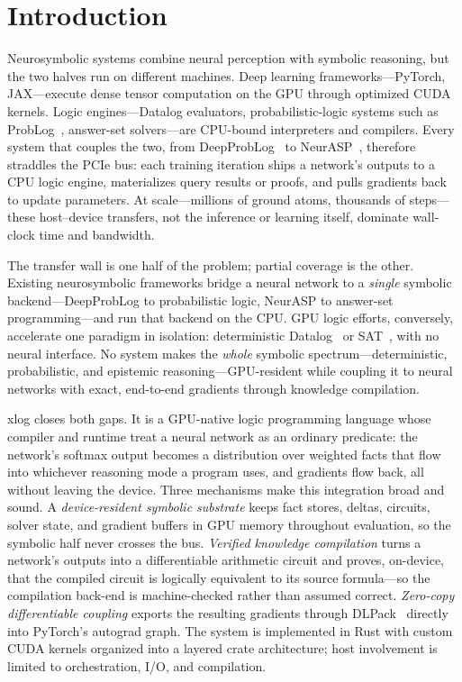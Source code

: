 \section{Introduction}\label{sec:intro}

Neurosymbolic systems combine neural perception with symbolic reasoning, but the two halves run on different machines. Deep learning frameworks---PyTorch, JAX---execute dense tensor computation on the GPU through optimized CUDA kernels. Logic engines---Datalog evaluators, probabilistic-logic systems such as ProbLog~\cite{problog2}, answer-set solvers---are CPU-bound interpreters and compilers. Every system that couples the two, from DeepProbLog~\cite{deepproblog} to NeurASP~\cite{neurasp}, therefore straddles the PCIe bus: each training iteration ships a network's outputs to a CPU logic engine, materializes query results or proofs, and pulls gradients back to update parameters. At scale---millions of ground atoms, thousands of steps---these host--device transfers, not the inference or learning itself, dominate wall-clock time and bandwidth.

The transfer wall is one half of the problem; partial coverage is the other. Existing neurosymbolic frameworks bridge a neural network to a \emph{single} symbolic backend---DeepProbLog to probabilistic logic, NeurASP to answer-set programming---and run that backend on the CPU. GPU logic efforts, conversely, accelerate one paradigm in isolation: deterministic Datalog~\cite{gpulog,vflog} or SAT~\cite{parafrost}, with no neural interface. No system makes the \emph{whole} symbolic spectrum---deterministic, probabilistic, and epistemic reasoning---GPU-resident while coupling it to neural networks with exact, end-to-end gradients through knowledge compilation.

xlog closes both gaps. It is a GPU-native logic programming language whose compiler and runtime treat a neural network as an ordinary predicate: the network's softmax output becomes a distribution over weighted facts that flow into whichever reasoning mode a program uses, and gradients flow back, all without leaving the device. Three mechanisms make this integration broad and sound. A \emph{device-resident symbolic substrate} keeps fact stores, deltas, circuits, solver state, and gradient buffers in GPU memory throughout evaluation, so the symbolic half never crosses the bus. \emph{Verified knowledge compilation} turns a network's outputs into a differentiable arithmetic circuit and proves, on-device, that the compiled circuit is logically equivalent to its source formula---so the compilation back-end is machine-checked rather than assumed correct. \emph{Zero-copy differentiable coupling} exports the resulting gradients through DLPack~\cite{dlpack} directly into PyTorch's autograd graph. The system is implemented in Rust with custom CUDA kernels organized into a layered crate architecture; host involvement is limited to orchestration, I/O, and compilation.

